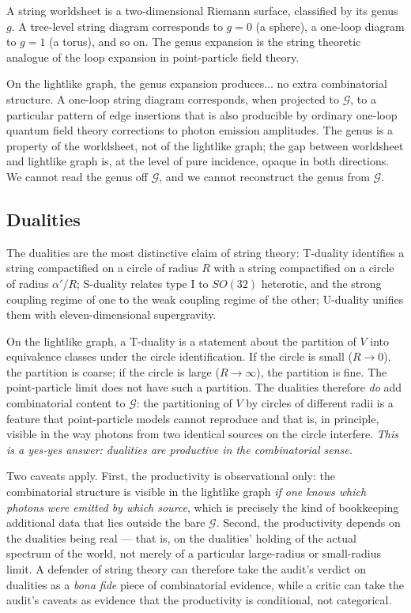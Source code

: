 \documentclass[11pt]{article}
\begin{document}
A string worldsheet is a two-dimensional Riemann surface, classified by its genus $g$. A tree-level string diagram corresponds to $g = 0$ (a sphere), a one-loop diagram to $g = 1$ (a torus), and so on. The genus expansion is the string theoretic analogue of the loop expansion in point-particle field theory.

On the lightlike graph, the genus expansion produces... no extra combinatorial structure. A one-loop string diagram corresponds, when projected to $\mathcal{G}$, to a particular pattern of edge insertions that is also producible by ordinary one-loop quantum field theory corrections to photon emission amplitudes. The genus is a property of the worldsheet, not of the lightlike graph; the gap between worldsheet and lightlike graph is, at the level of pure incidence, opaque in both directions. We cannot read the genus off $\mathcal{G}$, and we cannot reconstruct the genus from $\mathcal{G}$.

\subsection{Dualities}

The dualities are the most distinctive claim of string theory: T-duality identifies a string compactified on a circle of radius $R$ with a string compactified on a circle of radius $\alpha'/R$; S-duality relates type I to $SO(32)$ heterotic, and the strong coupling regime of one to the weak coupling regime of the other; U-duality unifies them with eleven-dimensional supergravity.

On the lightlike graph, a T-duality is a statement about the partition of $V$ into equivalence classes under the circle identification. If the circle is small ($R \to 0$), the partition is coarse; if the circle is large ($R \to \infty$), the partition is fine. The point-particle limit does not have such a partition. The dualities therefore \emph{do} add combinatorial content to $\mathcal{G}$: the partitioning of $V$ by circles of different radii is a feature that point-particle models cannot reproduce and that is, in principle, visible in the way photons from two identical sources on the circle interfere. \emph{This is a yes-yes answer: dualities are productive in the combinatorial sense.}

Two caveats apply. First, the productivity is observational only: the combinatorial structure is visible in the lightlike graph \emph{if one knows which photons were emitted by which source}, which is precisely the kind of bookkeeping additional data that lies outside the bare $\mathcal{G}$. Second, the productivity depends on the dualities being real --- that is, on the dualities' holding of the actual spectrum of the world, not merely of a particular large-radius or small-radius limit. A defender of string theory can therefore take the audit's verdict on dualities as a \emph{bona fide} piece of combinatorial evidence, while a critic can take the audit's caveats as evidence that the productivity is conditional, not categorical.
\end{document}
